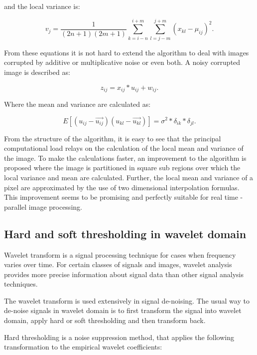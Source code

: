 and the local variance is:

\begin{equation}
    v_{j} =\dfrac{1}{(2n+1)(2m+1)} \sum_{k=i-n}^{i+m}\sum_{l=j-m}^{j+m} (x_{kl} - \mu_{ij} )^2.
    \label{eq:ls_filter_2}
\end{equation}

From these equations it is not hard to extend the algorithm to deal with images corrupted by additive or multiplicative noise or even both. A noisy corrupted image is described as: 

\begin{equation}
z_{ij} = x_{ij}*u_{ij} + w_{ij}.
    \label{eq:ls_filter_3}
\end{equation}

Where the mean and variance are calculated as:

\begin{equation}
    E[(u_{ij} - \vec{u_{ij}})( u_{kl} -\vec{u_{kl}})] = \sigma^2*\delta_{ik}*\delta_{jl}.
    \label{eq:ls_filter_4}
\end{equation}

From the structure of the algorithm, it is easy to see that the principal computational load relays on the calculation of the local mean and variance of the image. To make the calculations faster, an improvement to the algorithm is proposed where the image is partitioned in square sub regions over which the local variance and mean are calculated. Further, the local mean and variance of a pixel are approximated by the use of two dimensional interpolation formulas. This improvement seems to be promising and perfectly suitable for real time -parallel image processing.

\subsection{Hard and soft thresholding in wavelet domain}
Wavelet transform is a signal processing technique for cases when frequency varies over time. For certain classes of signals and images, wavelet analysis provides more precise information about signal data than other signal analysis techniques.

The wavelet transform is used extensively in signal de-noising. The usual way to de-noise signals in wavelet domain is to first transform the signal into wavelet domain, apply hard or soft thresholding and then transform back. 

Hard thresholding is a noise suppression method, that applies the following transformation to the empirical wavelet coefficients:

